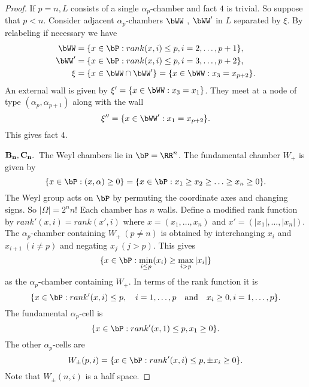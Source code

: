 \documentclass{memo-l}
\theoremstyle{definition}
\theoremstyle{remark}
\numberwithin{section}{chapter}
\numberwithin{equation}{chapter}
\begin{document}
\begin{proof}
   If $p = n, L$ consists of a single ${\alpha}_{p}$-chamber and fact $4$ is
trivial.  So suppose that $p<n$.  Consider adjacent ${\alpha}_{p}$-chambers
$\bWW$ , $\bWW'$ in $L$ separated by ${\xi}$.  By relabeling if
necessary we have
$$
\aligned
\bWW &= \{x  \in  \bP: rank(x,i) \le p, i = 2,\ldots ,p+1\},\\
\bWW' &= \{x  \in  \bP: rank(x,i) \le p, i = 3,\ldots ,p+2\},\\
{\xi} &= \{x  \in \bWW  \cap  \bWW'\} = \{x  \in  
\bWW: x_{3} = x_{p+2}\}.
\endaligned
$$
An external wall is given by ${\xi}' = \{x  \in  \bWW: x_{3} = x_{1}\}$.
 They meet at a node of type
$({\alpha}_{p},{\alpha}_{p+1})$ along with the wall
$$
{\xi}'' = \{ x  \in  \bWW': x_{1} = x_{p+2}\}.
$$
This gives fact $4$.

\medpagebreak

\noindent
$\bold{B_n,C_n.}$\  The Weyl chambers lie in $\bP = {\RR}^{n}$.  
The fundamental chamber $W_{+}$ is given by
$$
\{ x \in \bP: (x,{\alpha}) \ge 0\} = \{ x \in \bP: x_{1} \ge 
x_{2} \ge \ldots \ge x_{n} \ge 0\}.
$$
The Weyl group acts on $\bP$ by permuting the coordinate axes and
changing signs.  So $\vert {\Omega}\vert =2^{n}n$!  Each chamber has $n$
walls.  Define a modified rank function by $rank'(x,i) = rank(x',i)$ where
$x = (x_{1},\ldots ,x_{n})$ and $x' = (\vert x_{1}\vert ,\ldots ,\vert
x_{n}\vert )$.  The ${\alpha}_{p}$-chamber containing $W_{+}\ (p \ne n)$ is
obtained by interchanging $x_{i}$ and $x_{i+1}\ (i\ne p)$ and negating
$x_{j}\ (j > p)$.  This gives
$$
\{x  \in  \bP: \min_{i \le  p} (x_{i}) \ge \max_{i > p} \vert
x_{i}\vert \}
$$
as the ${\alpha}_{p}$-chamber containing $W_{+}$.  In terms of the rank
function it is
$$
\{x \in \bP: rank'(x,i) \le p,\quad i = 1,\ldots ,p\quad {\text{and}}\quad
x_{i} \ge 0, i = 1,\ldots ,p\}.
$$
The fundamental ${\alpha}_{p}$-cell is
$$
\{x  \in  \bP: rank'(x,1) \le p, x_{1} \ge 0\}.
$$
The other ${\alpha}_{p}$-cells are 
$$
W_{{\pm}}(p,i) = \{x  \in  \bP: rank'(x,i) \le p, {\pm}x_{i} \ge 0\}.
$$
Note that $W_{{\pm}}(n,i)$ is a half space.


\end{proof}
\end{document}
